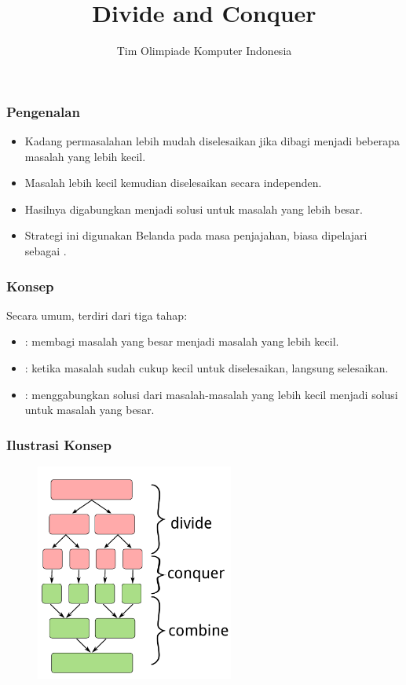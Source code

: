 

\title{Divide and Conquer}
\author{Tim Olimpiade Komputer Indonesia}
\date{}



\begin{frame}
\titlepage
\end{frame}

\begin{frame}
\frametitle{Pengenalan}
\begin{itemize}
  \item Kadang permasalahan lebih mudah diselesaikan jika dibagi menjadi beberapa masalah yang lebih kecil.
  \item Masalah lebih kecil kemudian diselesaikan secara independen.
  \item Hasilnya digabungkan menjadi solusi untuk masalah yang lebih besar.
  \item Strategi ini digunakan Belanda pada masa penjajahan, biasa dipelajari sebagai .
\end{itemize}
\end{frame}

\begin{frame}
\frametitle{Konsep}
Secara umum, \fDivideAndConquer terdiri dari tiga tahap:
\begin{itemize}
  \item {}: membagi masalah yang besar menjadi masalah yang lebih kecil.
  \item {}: ketika masalah sudah cukup kecil untuk diselesaikan, langsung selesaikan.
  \item {}: menggabungkan solusi dari masalah-masalah yang lebih kecil menjadi solusi untuk masalah yang besar.
\end{itemize}
\end{frame}

\begin{frame}
\frametitle{Ilustrasi Konsep}
\begin{figure}
  \includegraphics[width=6.5cm]{asset/dnc-concept.pdf}
\end{figure}
\end{frame}

